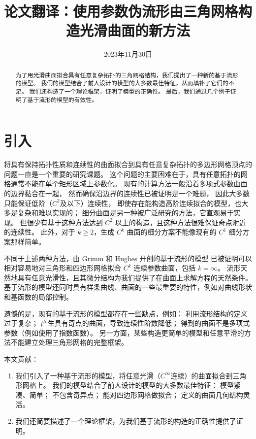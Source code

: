 \documentclass{ctexart}
\title{论文翻译：使用参数伪流形由三角网格构造光滑曲面的新方法}
\date{2023年11月30日}
\begin{document}
\maketitle

\begin{abstract}
	为了用光滑曲面拟合具有任意复杂拓扑的三角网格结构，我们提出了一种新的基于流形的模型。
	我们的模型结合了前人设计的模型的大多数最佳特征，从而填补了它们的不足。
	我们还构造了一个理论框架，证明了模型的正确性。
	最后，我们通过几个例子证明了基于流形的模型的有效性。
\end{abstract}

\section{引入}
	将具有保持拓扑性质和连续性的曲面拟合到具有任意复杂拓扑的多边形网格顶点的问题一直是一个重要的研究课题。
	这个问题的主要困难在于，具有任意拓扑的网格通常不能在单个矩形区域上参数化。
	现有的计算方法一般沿着多项式参数曲面的边界黏合在一起，
	然而确保沿边界的连续性已被证明是一个难题，
	因此大多数只能保证低阶（$C^2$及以下）连续性，
	即使存在能构造高阶连续拟合的模型，也大多是复杂和难以实现的；
	细分曲面是另一种被广泛研究的方法，它直观易于实现。
	但很少有基于这种方法达到 $C^2$ 以上的构造，且这种方法很难保证奇点附近的连续性。
	此外，对于 $k\geq 2$，生成 $C^k$ 曲面的细分方案不能像现有的 $C^1$ 细分方案那样简单。

	不同于上述两种方法，由 Grimm 和 Hughes 开创的基于流形的模型
	已被证明可以相对容易地对三角形和四边形网格拟合 $C^k$ 连续参数曲面，包括 $k=\infty$。
	流形天然地具有任意光滑性，且其微分结构为我们提供了在曲面上求解方程的天然条件。
	基于流形的模型还同时具有样条曲线、曲面的一些最重要的特性，例如对曲线形状和基函数的局部控制。

	遗憾的是，现有的基于流形的模型都存在一些缺点，例如：
	利用流形结构的定义过于复杂；
	产生具有奇点的曲面，导致连续性阶数降低；
	得到的曲面不是多项式参数（例如使用了指数函数）。
	另一方面，某些构造更简单的模型和任意平滑的方法不能建立处理三角形网格的完整框架。

	本文贡献：
	\begin{enumerate}
		\item 我们引入了一种基于流形的模型，将任意光滑（$C^\infty$连续）的曲面拟合到三角形网格上。
			我们的模型结合了前人设计的模型的大多数最佳特征：
			模型紧凑、简单；
			不包含奇异点；
			能对四边形网格做拟合；
			定义的曲面几何结构灵活。
		\item 我们还简要描述了一个理论框架，为我们基于流形的构造的正确性提供了证明。
	\end{enumerate}
\end{document}
